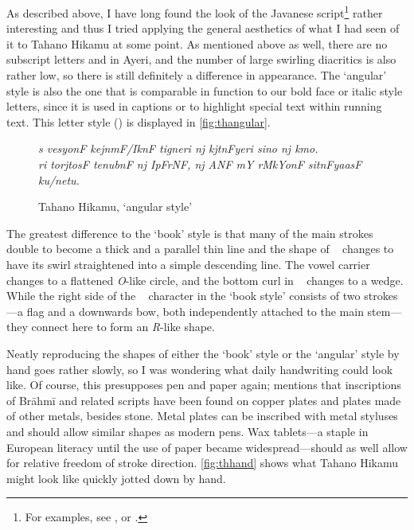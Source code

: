 As described above, I have long found the look of the Javanese 
script\footnote{For examples, see \citet{everson2008}, or .} 
rather interesting and thus I tried applying the general aesthetics of what I 
had seen of it to Tahano Hikamu at some point. As mentioned above as well, 
there are no subscript letters and in Ayeri, and the number of large swirling 
diacritics is also rather low, so there is still definitely a difference in 
appearance. The `angular' style is also the one that is comparable in function 
to our bold face or italic style letters, since it is used in captions or to 
highlight special text within running text. This letter style 
() is displayed in \autoref{fig:thangular}. 

\begin{figure}[ht]\centering
\caption{Tahano Hikamu, `angular style'}
{\Tagati\itshape\Large s vesyonF kejnmF/IknF tigneri nj kjtnFyeri sino nj kmo.\\
ri torjtosF tenubnF nj IpFrNF, nj ANF mY rMkYonF sitnFyaasF ku/netu.}
\label{fig:thangular}
\end{figure}

The greatest difference to the `book' style is that many of the main strokes 
double to become a thick and a parallel thin line and the shape of 
~ changes to have its swirl straightened into a simple 
descending line. The vowel carrier  changes to a flattened 
\textit{O}-like circle, and the bottom curl in ~ changes to a 
wedge. While the right side of the ~ character in the `book 
style' consists of two strokes---a flag and a downwards bow, both 
independently attached to the main stem---they connect here to form an 
\emph{R}-like shape.

Neatly reproducing the shapes of either the `book' style or the `angular' 
style by hand goes rather slowly, so I was wondering what daily handwriting 
could look like. Of course, this presupposes pen and paper again;
\citet[377]{salomon1996} mentions that inscriptions of Brāhmī and related 
scripts have been found on copper plates and plates made of other metals, 
besides stone. Metal plates can be inscribed with metal styluses and should 
allow similar shapes as modern pens. Wax tablets---a staple in European literacy 
until the use of paper became widespread---should as well allow for relative 
freedom of stroke direction.
\autoref{fig:thhand} shows what Tahano Hikamu might look like quickly jotted 
down by hand.

